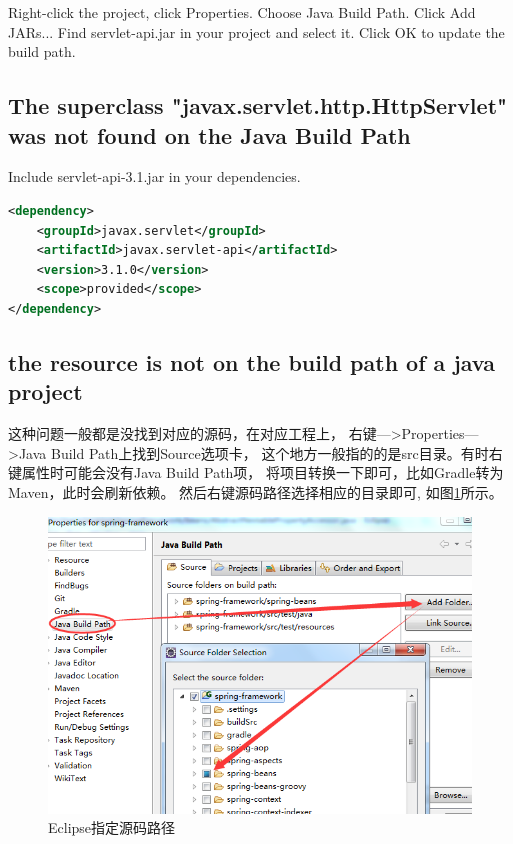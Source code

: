 \documentclass{book}
\begin{document}
Right-click the project, click Properties.
Choose Java Build Path.
Click Add JARs...
Find servlet-api.jar in your project and select it.
Click OK to update the build path.

\subsection{The superclass "javax.servlet.http.HttpServlet" was not found on the Java Build Path}

Include servlet-api-3.1.jar in your dependencies.

\begin{lstlisting}[language=XML]
<dependency>
	<groupId>javax.servlet</groupId>
	<artifactId>javax.servlet-api</artifactId>
	<version>3.1.0</version>
	<scope>provided</scope>
</dependency>
\end{lstlisting}

\subsection{the resource is not on the build path of a java project}

这种问题一般都是没找到对应的源码，在对应工程上，
右键--->Properties--->Java Build Path上找到Source选项卡，
这个地方一般指的的是src目录。有时右键属性时可能会没有Java Build Path项，
将项目转换一下即可，比如Gradle转为Maven，此时会刷新依赖。
然后右键源码路径选择相应的目录即可,
如图\ref{fig:EclipseChooseJavaBuildFolder}所示。

\begin{figure}[htbp]
	\centering
	\includegraphics[scale=0.5]{EclipseChooseJavaBuildFolder.png}
	\caption{Eclipse指定源码路径}
	\label{fig:EclipseChooseJavaBuildFolder}
\end{figure}
\end{document}
